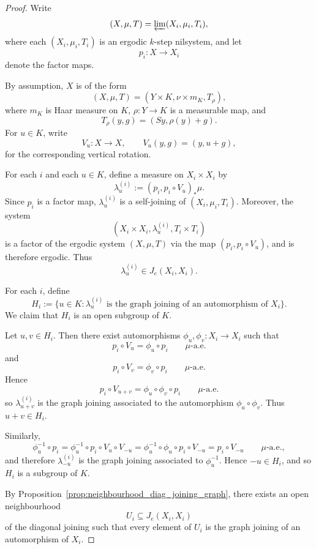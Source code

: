 \documentclass[12pt]{amsart}
\theoremstyle{plain}
\theoremstyle{definition}
\begin{document}
\begin{proof}
    Write
    \[
    (X,\mu,T)=\varprojlim (X_i,\mu_i,T_i),
    \]
    where each $(X_i,\mu_i,T_i)$ is an ergodic $k$-step nilsystem, and let
    \[
    p_i\colon X\to X_i
    \]
    denote the factor maps.

    By assumption, $X$ is of the form 
    \[
    (X,\mu,T)=(Y\times K,\nu\times m_K,T_\rho),
    \]
    where $m_K$ is Haar measure on $K$, $\rho\colon Y\to K$ is a measurable map, and
    \[
    T_\rho(y,g)=(Sy,\rho(y)+g).
    \]
    For $u\in K$, write
    \[
    V_u\colon X\to X,\qquad V_u(y,g)=(y,u+g),
    \]
    for the corresponding vertical rotation.

    For each $i$ and each $u\in K$, define a measure on $X_i\times X_i$ by
    \[
    \lambda_u^{(i)}:=(p_i,p_i\circ V_u)_*\mu.
    \]
    Since $p_i$ is a factor map, $\lambda_u^{(i)}$ is a self-joining of $(X_i,\mu_i,T_i)$.
    Moreover, the system
    \[
    (X_i\times X_i,\lambda_u^{(i)},T_i\times T_i)
    \]
    is a factor of the ergodic system $(X,\mu,T)$ via the map $(p_i,p_i\circ V_u)$, and is therefore ergodic.
    Thus
    \[
    \lambda_u^{(i)}\in J_e(X_i,X_i).
    \]

    For each $i$, define
    \[
    H_i:=\{u\in K : \lambda_u^{(i)} \text{ is the graph joining of an automorphism of }X_i\}.
    \]
    We claim that $H_i$ is an open subgroup of $K$.

    Let $u,v\in H_i$.
    Then there exist automorphisms $\phi_u,\phi_v\colon X_i\to X_i$ such that
    \[
    p_i\circ V_u=\phi_u\circ p_i \qquad \mu\text{-a.e.}
    \]
    and
    \[
    p_i\circ V_v=\phi_v\circ p_i \qquad \mu\text{-a.e.}
    \]
    Hence
    \[
    p_i\circ V_{u+v}
    =\phi_u\circ \phi_v\circ p_i
    \qquad \mu\text{-a.e.}
    \]
    so $\lambda_{u+v}^{(i)}$ is the graph joining associated to the automorphism $\phi_u\circ\phi_v$.
    Thus $u+v\in H_i$.

    Similarly,
    \[
    \phi_u^{-1}\circ p_i
    =\phi_u^{-1}\circ p_i\circ V_u\circ V_{-u}
    =\phi_u^{-1}\circ \phi_u\circ p_i\circ V_{-u}
    =p_i\circ V_{-u}
    \qquad \mu\text{-a.e.},
    \]
    and therefore $\lambda_{-u}^{(i)}$ is the graph joining associated to $\phi_u^{-1}$.
    Hence $-u\in H_i$, and so $H_i$ is a subgroup of $K$.

    By Proposition~\ref{prop:neighbourhood_diag_joining_graph}, there exists an open neighbourhood
    \[
    U_i\subseteq J_e(X_i,X_i)
    \]
    of the diagonal joining such that every element of $U_i$ is the graph joining of an automorphism of $X_i$.
    

\end{proof}
\end{document}
